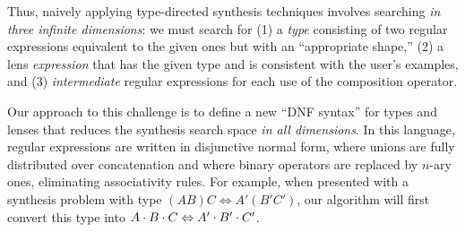 \documentclass[numbers,10pt,preprint\ifanon ,nocopyrightspace\fi]{sigplanconf}
\begin{document}

Thus, naively applying type-directed synthesis techniques
involves searching \emph{in three infinite dimensions}:  we must
search for
(1) a \emph{type} consisting of two regular expressions equivalent to the
given ones but with an ``appropriate shape,'' 
(2) a lens \emph{expression} that has the given type and is consistent
with the user's examples, and 
(3) {\em intermediate} regular expressions for each use of the composition
operator.  

Our approach to this challenge is to define a new ``DNF syntax'' for types
and lenses that reduces the synthesis search space \emph{in all dimensions}.
In this language, regular expressions are written in disjunctive normal
form, where unions are fully distributed over concatenation and where binary
operators are replaced by $n$-ary ones, eliminating associativity rules.
For example, when presented with a synthesis problem with type
$(A B) C \Leftrightarrow A' (B' C')$, our algorithm will first convert this
type into $A \cdot B \cdot C \Leftrightarrow A' \cdot B' \cdot C'$.
\end{document}
